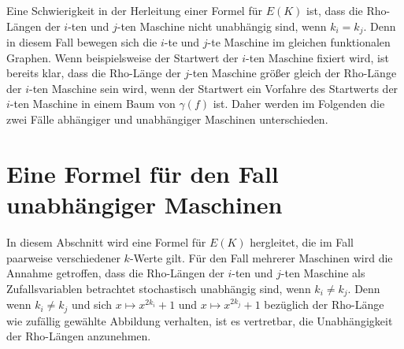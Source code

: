 \documentclass[a4paper, 10pt, ngerman]{article}
\begin{document}
Eine Schwierigkeit in der Herleitung einer Formel für $E(K)$ ist, dass die Rho-Längen der $i$-ten und $j$-ten Maschine nicht unabhängig sind, wenn $k_i = k_j$. Denn in diesem Fall bewegen sich die $i$-te und $j$-te Maschine im gleichen funktionalen Graphen. Wenn beispielsweise der Startwert der $i$-ten Maschine fixiert wird, ist bereits klar, dass die Rho-Länge der $j$-ten Maschine größer gleich der Rho-Länge der $i$-ten Maschine sein wird, wenn der Startwert ein Vorfahre des Startwerts der $i$-ten Maschine in einem Baum von $\gamma(f)$ ist. Daher werden im Folgenden die zwei Fälle abhängiger und unabhängiger Maschinen unterschieden.

\section{Eine Formel für den Fall unabhängiger Maschinen}

In diesem Abschnitt wird eine Formel für $E(K)$ hergleitet, die im Fall paarweise verschiedener $k$-Werte gilt. Für den Fall mehrerer Maschinen wird die Annahme getroffen, dass die Rho-Längen der $i$-ten und $j$-ten Maschine als Zufallsvariablen betrachtet stochastisch unabhängig sind, wenn $k_i \ne k_j$. Denn wenn $k_i \ne k_j$ und sich $x \mapsto x^{2k_i} + 1$ und $x \mapsto x^{2k_j} + 1$ bezüglich der Rho-Länge wie zufällig gewählte Abbildung verhalten, ist es vertretbar, die Unabhängigkeit der Rho-Längen anzunehmen.
\end{document}
